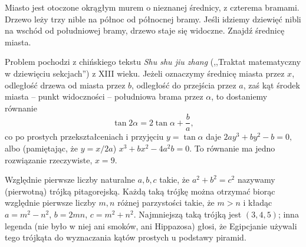 \begin{problem} %
    Miasto jest otoczone okrągłym murem o nieznanej średnicy, z czterema bramami.
    Drzewo leży trzy nible na północ od północnej bramy.
    Jeśli idziemy dziewięć nibli na wschód od południowej bramy, drzewo staje się widoczne. 
    Znajdź średnicę miasta.
\end{problem}

Problem pochodzi z chińskiego tekstu \emph{Shu shu jiu zhang} (,,Traktat matematyczny w dziewięciu sekcjach'') z XIII wieku.
Jeżeli oznaczymy średnicę miasta przez $x$, odległość drzewa od miasta przez $b$, odległość do przejścia przez $a$, zaś kąt środek miasta -- punkt widoczności -- południowa brama przez $\alpha$, to dostaniemy równanie
\begin{equation}
    \tan 2 \alpha = 2 \tan \alpha + \frac ba,
\end{equation}
co po prostych przekształceniach i przyjęciu $y = \tan \alpha$ daje
$
    2ay^3 + by^2 - b = 0,
$
albo (pamiętając, że $y = x/2a$)
$
    x^3 + bx^2 - 4a^2 b = 0.
$
To równanie ma jedno rozwiązanie rzeczywiste, $x = 9$.

Względnie pierwsze liczby naturalne $a, b, c$ takie, że $a^2 + b^2 = c^2$ nazywamy (pierwotną) trójką pitagorejską.
%
Każdą taką trójkę można otrzymać biorąc względnie pierwsze liczby $m, n$ różnej parzystości takie, że $m > n$ i kładąc $a = m^2 - n^2$, $b = 2 mn$, $c = m^2 + n^2$.
Najmniejszą taką trójką jest $(3, 4, 5)$; inna legenda (nie było w niej ani smoków, ani Hippazosa) głosi, że Egipcjanie używali tego trójkąta do wyznaczania kątów prostych u podstawy piramid.

